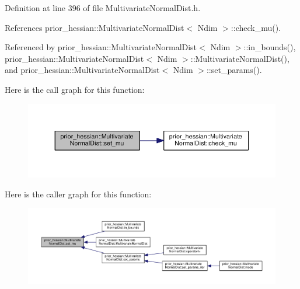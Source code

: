 Definition at line 396 of file Multivariate\+Normal\+Dist.\+h.



References prior\+\_\+hessian\+::\+Multivariate\+Normal\+Dist$<$ Ndim $>$\+::check\+\_\+mu().



Referenced by prior\+\_\+hessian\+::\+Multivariate\+Normal\+Dist$<$ Ndim $>$\+::in\+\_\+bounds(), prior\+\_\+hessian\+::\+Multivariate\+Normal\+Dist$<$ Ndim $>$\+::\+Multivariate\+Normal\+Dist(), and prior\+\_\+hessian\+::\+Multivariate\+Normal\+Dist$<$ Ndim $>$\+::set\+\_\+params().



Here is the call graph for this function\+:\nopagebreak
\begin{figure}[H]
\begin{center}
\leavevmode
\includegraphics[width=350pt]{classprior__hessian_1_1MultivariateNormalDist_a3a232f67a79457c91ce1c061a19d18bc_cgraph}
\end{center}
\end{figure}




Here is the caller graph for this function\+:\nopagebreak
\begin{figure}[H]
\begin{center}
\leavevmode
\includegraphics[width=350pt]{classprior__hessian_1_1MultivariateNormalDist_a3a232f67a79457c91ce1c061a19d18bc_icgraph}
\end{center}
\end{figure}


